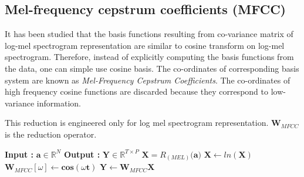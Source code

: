\subsection{Mel-frequency cepstrum coefficients (MFCC)}
\label{mfcc}
It has been studied that the basis functions resulting from co-variance matrix of log-mel spectrogram representation are similar to cosine transform on log-mel spectrogram\cite{mfcc_pca}. Therefore, instead of explicitly computing the basis functions from the data, one can simple use cosine basis. The co-ordinates of corresponding basis system are known as \textit{Mel-Frequency Cepstrum Coefficients}. The co-ordinates of high frequency cosine functions are discarded because they correspond to low-variance information. 
\bigskip

\noindent This reduction is engineered only for log mel spectrogram representation. $\textbf{W}_{MFCC}$ is the reduction operator.

\begin{algorithm}
  \caption{$\textbf{Y}$ = $MFCC$($\textbf{a}$) }\label{MFCC}
  \begin{algorithmic}[1]
    \Statex \textbf{Input :} $\textbf{a} \in \mathbb{R}^{N}$
    \Statex \textbf{Output :} $\textbf{Y} \in \mathbb{R}^{T \times P}$
    \State $\textbf{X} = R_{(MEL)} \big( \textbf{a} \big) $  
    \State $\textbf{X} \leftarrow ln(\textbf{X})$
    \State $\textbf{W}_{MFCC}[ \omega ] \leftarrow \textbf{cos}( \omega \textbf{t})$  
    \EndFor
    \State $\textbf{Y} \leftarrow \textbf{W}_{MFCC}\textbf{X}$
  \end{algorithmic}
\end{algorithm}
 

